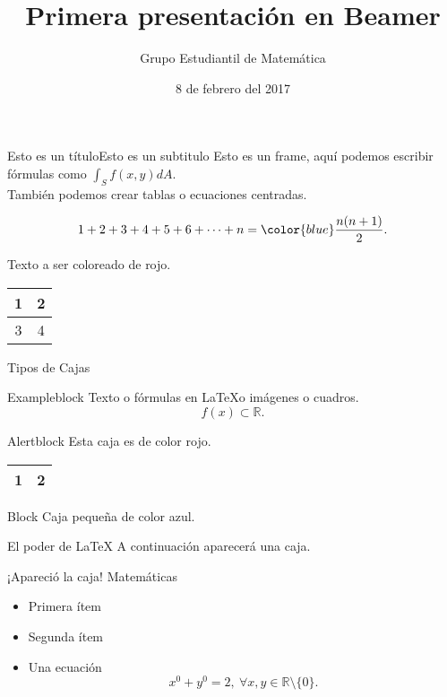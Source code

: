 \documentclass[handout]{beamer}
\author{Grupo Estudiantil de Matemática}
\title{Primera presentación en Beamer}
\institute{\LARGE{Universidad Nacional de Ingeniería\\Facultad de Ciencias}}
\date{8 de febrero del 2017} %
\newcommand{\ds}{\displaystyle}
\newcommand{\re}{\mathbb{R}}
\begin{document}
\begin{frame}
		\maketitle
\end{frame}

\begin{frame}{Esto es un título}{Esto es un subtitulo}
Esto es un frame, aquí podemos escribir fórmulas como \(\ds\int_S f(x,y)dA \).\\
También podemos crear tablas o ecuaciones centradas.

\[1+2+3+4+5+6+\cdots+n = {\color{blue}\frac{n(n+1)}{2}}.\]

{\color{red} Texto a ser coloreado de rojo.}

\begin{center}

	\begin{tabular}{||c||c||}
		\hline 1 & 2 \\ \hline
		\hline 3 & 4 \\ \hline
		\hline 
	\end{tabular}
	
\end{center}
	
\end{frame}

\begin{frame}{Tipos de Cajas}

\begin{exampleblock}{Exampleblock}
Texto o fórmulas en \LaTeX o imágenes o cuadros.
\[f(x)\subset \re.\]
\end{exampleblock}
	
\begin{alertblock}{Alertblock}
Esta caja es de color rojo.

\begin{center}
	\begin{tabular}{||c||c||}
		\hline 1 & 2 \\ \hline						
	\end{tabular} 
\end{center}
	
\end{alertblock}

\begin{block}{Block}
	Caja pequeña de color azul.
\end{block}	
\end{frame}

\begin{frame}{El poder de \LaTeX}
A continuación aparecerá una caja. \pause 
\begin{alertblock}{¡Apareció la caja!}
	Matemáticas
	\begin{itemize}
		\item Primera ítem \pause
		\item Segunda ítem  \pause
		\item Una ecuación \pause \[x^0+y^0=2,~\forall x,y\in\re\setminus\{0\}.\]
	\end{itemize}
	
\end{alertblock}
	
\end{frame}
\end{document}
